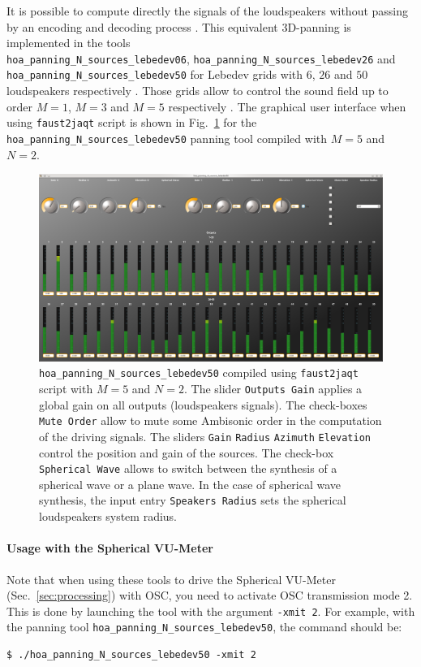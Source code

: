 \documentclass[10pt,a4paper]{article}
\begin{document}
It is possible to compute directly the signals of the loudspeakers without passing by an encoding and decoding process \cite{lecomte2015on}. This equivalent 3D-panning is implemented in the tools \\ \lstinline'hoa_panning_N_sources_lebedev06', \lstinline'hoa_panning_N_sources_lebedev26' and \\ \lstinline'hoa_panning_N_sources_lebedev50' for Lebedev grids with $6$, $26$ and $50$ loudspeakers respectively \cite{lebedev1975values,lecomte2015on}. Those grids allow to control the sound field up to order $M=1$, $M=3$ and $M=5$ respectively \cite{lecomte2015on}. 
The graphical user interface when using \lstinline'faust2jaqt' script is shown in Fig.~\ref{fig:hoa_panning_N_sources_lebedev50} for the \lstinline'hoa_panning_N_sources_lebedev50' panning tool compiled with $M=5$ and $N=2$.
\begin{figure}[!ht]
\includegraphics[width=\columnwidth]{hoa_panning_lebedev50.png}
\caption{\lstinline'hoa_panning_N_sources_lebedev50' compiled using \lstinline'faust2jaqt' script with $M=5$ and $N=2$. The slider \lstinline'Outputs Gain' applies a global gain on all outputs (loudspeakers signals). The check-boxes \lstinline'Mute Order' allow to mute some Ambisonic order in the computation of the driving signals. The sliders \lstinline'Gain' \lstinline'Radius' \lstinline'Azimuth' \lstinline'Elevation' control the position and gain of the sources. The check-box \lstinline'Spherical Wave' allows to switch between the synthesis of a spherical wave or a plane wave. In the case of spherical wave synthesis, the input entry \lstinline'Speakers Radius' sets the spherical loudspeakers system radius.}
\label{fig:hoa_panning_N_sources_lebedev50}
\end{figure}
\paragraph{Usage with the Spherical VU-Meter}
Note that when using these tools to drive the Spherical VU-Meter (Sec.~\ref{sec:processing}) with OSC, you need to activate OSC transmission mode 2. This is done by launching the tool with the argument \lstinline'-xmit 2'. For example, with the panning tool \lstinline'hoa_panning_N_sources_lebedev50', the command should be:
\begin{lstlisting}
$ ./hoa_panning_N_sources_lebedev50 -xmit 2
\end{lstlisting}
\pagebreak
\end{document}
